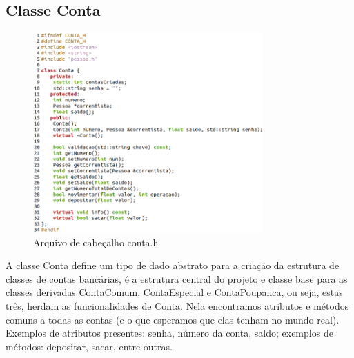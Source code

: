 \documentclass[conference]{IEEEtran}
\begin{document}
\subsection{Classe Conta}
\begin{figure}[htbp]
    \centering
    \includegraphics[width=8.8cm]{../img/Conta.png}
    \caption{Arquivo de cabeçalho conta.h}
    \label{fig_conta}
\end{figure}
A classe Conta define um tipo de dado abstrato para a criação da estrutura de classes de contas bancárias, é a estrutura central do projeto e classe base para as classes derivadas ContaComum, ContaEspecial e ContaPoupanca, ou seja, estas três, herdam as funcionalidades de Conta. Nela encontramos atributos e métodos comuns a todas as contas (e o que esperamos que elas tenham no mundo real). Exemplos de atributos presentes: senha, número da conta, saldo; exemplos de métodos: depositar, sacar, entre outras.
\end{document}
